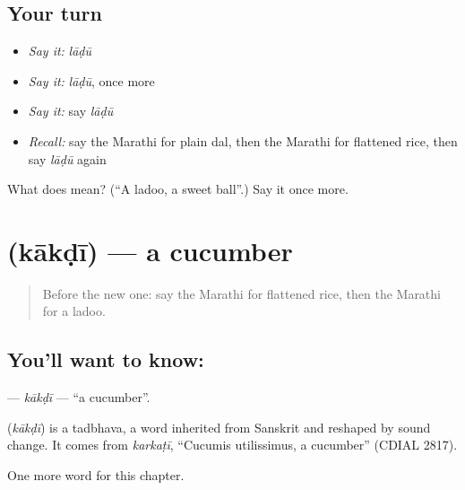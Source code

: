 \subsection*{Your turn}
\begin{itemize}
\raggedright
  \item \emph{Say it:} \emph{lāḍū}
  \item \emph{Say it:} \emph{lāḍū}, once more
  \item \emph{Say it:} say \emph{lāḍū}
  \item \emph{Recall:} say the Marathi for plain dal, then the Marathi for flattened rice, then say \emph{lāḍū} again
\end{itemize}

\begin{tcolorbox}[breakable,colback=teal!4,colframe=teal!35!black,title={Before you move on}]
What does  mean? (\textquotedblleft{}A ladoo, a sweet ball\textquotedblright{}.) Say it once more.
\end{tcolorbox}
\section[\texorpdfstring{\mr{काकडी} (kākḍī)}{काकडी (kākḍī)}]{ (kākḍī) — a cucumber}

\label{lesson:MR-C137-kakdi}



\begin{quote}
Before the new one: say the Marathi for flattened rice, then the Marathi for a ladoo.
\end{quote}

\subsection*{You'll want to know: }
\textbf{} — \emph{kākḍī} — \textquotedblleft{}a cucumber\textquotedblright{}.

\begin{cousinweb}
\textbf{} (\emph{kākḍī}) is a tadbhava, a word inherited from Sanskrit and reshaped by sound change. It comes from \emph{karkaṭī}, \textquotedblleft{}Cucumis utilissimus, a cucumber\textquotedblright{} (CDIAL 2817).
\end{cousinweb}

\begin{grammarlens}[title={What you've built}]
One more word for this chapter.
\end{grammarlens}

